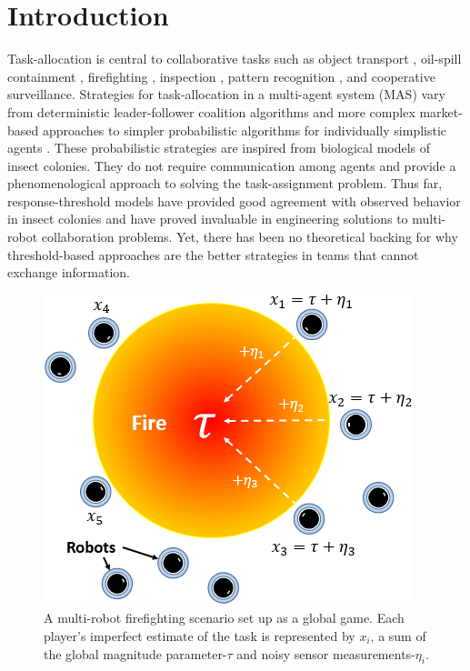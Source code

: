 \documentclass[conference]{ieeeconf}
\begin{document}
\section{Introduction}\label{sec:intro}
Task-allocation is central to collaborative tasks such as object transport \cite{Sugawara2012}, oil-spill containment \cite{Beni2005}, firefighting \cite{Kanakia2014}, inspection \cite{Correll2007}, pattern recognition \cite{Beni1993}, and cooperative surveillance. Strategies for task-allocation \cite{Gerkey2004} in a multi-agent system (MAS) vary from deterministic leader-follower coalition algorithms \cite{Chen2011} and more complex market-based approaches \cite{Amstutz2008} to simpler probabilistic algorithms for individually simplistic agents \cite{Dantu2012}. These probabilistic strategies are inspired from biological models of insect colonies. They do not require communication among agents and provide a phenomenological approach to solving the task-assignment problem. Thus far, response-threshold models have provided good agreement with observed behavior in insect colonies and have proved invaluable in engineering solutions to multi-robot collaboration problems. Yet, there has been no theoretical backing for why threshold-based approaches are the better strategies in teams that cannot exchange information.

\begin{figure}[!htb]
\centering\includegraphics[width=0.9\columnwidth]{../figures/globalgamesetup.png}
\centering\caption{A multi-robot firefighting scenario set up as a global game. Each player's imperfect estimate of the task is represented by $x_i$, a sum of the global magnitude parameter-$\tau$ and noisy sensor measurements-$\eta_i$.}\label{fig:ggsetup}
\end{figure}
\end{document}
